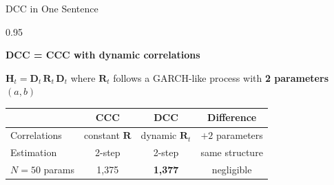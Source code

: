 \documentclass[9pt, aspectratio=169, t]{beamer}
\begin{document}
\begin{frame}{DCC in One Sentence}
    \begin{cminipage}{0.95\textwidth}
    \vspace{1cm}
    {\Large
    \begin{center}
        \textcolor{MainBlue}{\textbf{DCC = CCC with dynamic correlations}}
    \end{center}
    }
    \vspace{0.5cm}
    {\footnotesize
    \begin{center}
        $\mathbf{H}_t = \mathbf{D}_t\,\mathbf{R}_t\,\mathbf{D}_t$
        \qquad where $\mathbf{R}_t$ follows a GARCH-like process with \textbf{2 parameters} $(a, b)$
    \end{center}
    \vspace{0.5cm}
    \begin{center}
        \renewcommand{\arraystretch}{1.4}
        \begin{tabular}{lccc}
            \hline
            & \textbf{CCC} & \textbf{DCC} & \textbf{Difference} \\
            \hline
            Correlations & constant $\mathbf{R}$ & dynamic $\mathbf{R}_t$ & $+2$ parameters \\
            Estimation & 2-step & 2-step & same structure \\
            $N = 50$ params & 1,375 & \textbf{1,377} & negligible \\
            \hline
        \end{tabular}
    \end{center}
    }
    \end{cminipage}
\end{frame}
\end{document}
